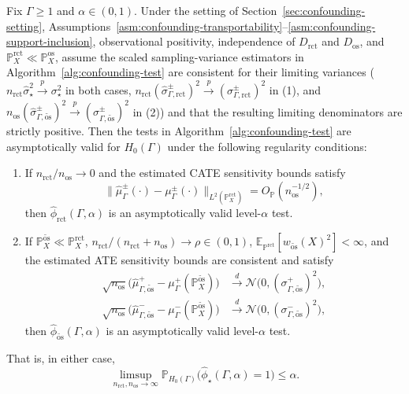 \begin{proposition}
\label{prop:confounding-test-validity}
Fix \(\Gamma\geq 1\) and \(\alpha\in(0,1)\). Under the setting of Section~\ref{sec:confounding-setting}, Assumptions~\ref{asm:confounding-transportability}--\ref{asm:confounding-support-inclusion}, observational positivity, independence of \(D_{\mathrm{rct}}\) and \(D_{\mathrm{os}}\), and \(\mathbb{P}^{\mathrm{rct}}_X \ll \mathbb{P}^{\mathrm{os}}_X\), assume the scaled sampling-variance estimators in Algorithm~\ref{alg:confounding-test} are consistent for their limiting variances (\(n_{\mathrm{rct}}\widehat{\sigma}_{\star}^2 \xrightarrow{p} \sigma_{\star}^2\) in both cases, \(n_{\mathrm{rct}}(\widehat{\sigma}^{\pm}_{\Gamma,\mathrm{rct}})^2 \xrightarrow{p} (\sigma^{\pm}_{\Gamma,\mathrm{rct}})^2\) in (1), and \(n_{\mathrm{os}}(\widehat{\sigma}^{\pm}_{\Gamma,\widetilde{\mathrm{os}}})^2 \xrightarrow{p} (\sigma^{\pm}_{\Gamma,\widetilde{\mathrm{os}}})^2\) in (2)) and that the resulting limiting denominators are strictly positive. Then the tests in Algorithm~\ref{alg:confounding-test} are asymptotically valid for \(H_0(\Gamma)\) under the following regularity conditions:
\begin{enumerate}
  \item If \(n_{\mathrm{rct}}/n_{\mathrm{os}}\to 0\) and the estimated CATE sensitivity bounds satisfy
  \[
    \bigl\|
      \widehat{\mu}^{\pm}_{\Gamma}(\cdot)
      -
      \mu^{\pm}_{\Gamma}(\cdot)
    \bigr\|_{L^2(\mathbb{P}^{\mathrm{rct}}_X)}
    =
    O_{\mathbb{P}}(n_{\mathrm{os}}^{-1/2}),
  \]
  then \(\widehat{\phi}_{\mathrm{rct}}(\Gamma,\alpha)\) is an asymptotically valid level-\(\alpha\) test.
  \item If \(\mathbb{P}^{\widetilde{\mathrm{os}}}_X \ll \mathbb{P}^{\mathrm{rct}}_X\), \(n_{\mathrm{rct}}/(n_{\mathrm{rct}}+n_{\mathrm{os}})\to\rho\in(0,1)\), \(\mathbb{E}_{\mathbb{P}^{\mathrm{rct}}}[w_{\widetilde{\mathrm{os}}}(X)^2]<\infty\), and the estimated ATE sensitivity bounds are consistent and satisfy
  \[
  \begin{aligned}
    \sqrt{n_{\mathrm{os}}}
    \bigl(
      \widehat{\mu}^{+}_{\Gamma,\widetilde{\mathrm{os}}}
      -
      \mu^{+}_{\Gamma}(\mathbb{P}^{\widetilde{\mathrm{os}}}_X)
    \bigr)
    &\xrightarrow{d}
    \mathcal{N}\bigl(0,(\sigma^{+}_{\Gamma,\widetilde{\mathrm{os}}})^2\bigr), \\
    \sqrt{n_{\mathrm{os}}}
    \bigl(
      \widehat{\mu}^{-}_{\Gamma,\widetilde{\mathrm{os}}}
      -
      \mu^{-}_{\Gamma}(\mathbb{P}^{\widetilde{\mathrm{os}}}_X)
    \bigr)
    &\xrightarrow{d}
    \mathcal{N}\bigl(0,(\sigma^{-}_{\Gamma,\widetilde{\mathrm{os}}})^2\bigr),
  \end{aligned}
  \]
  then \(\widehat{\phi}_{\widetilde{\mathrm{os}}}(\Gamma,\alpha)\) is an asymptotically valid level-\(\alpha\) test.
\end{enumerate}
That is, in either case,
\[
  \limsup_{n_{\mathrm{rct}},n_{\mathrm{os}}\to\infty}
  \mathbb{P}_{H_0(\Gamma)}
  \bigl(
    \widehat{\phi}_{\star}(\Gamma,\alpha)=1
  \bigr)
  \leq
  \alpha.
\]
\end{proposition}


